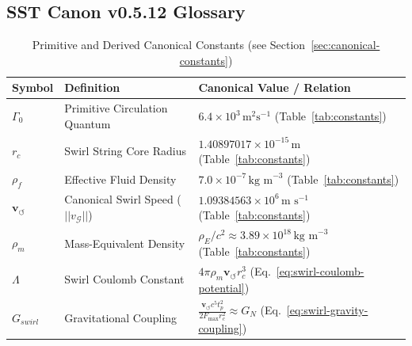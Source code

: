 \documentclass[10pt,reprint,aps,onecolumn,nofootinbib]{revtex4-2}
\begin{document}
            \subsection*{SST Canon v0.5.12 Glossary}
                \begin{table}[h!]
                    \centering
                    \scriptsize
                    \caption{Primitive and Derived Canonical Constants (see Section~\ref{sec:canonical-constants})}
                    \label{tab:glossary-constants}

                    \begin{tabular}{|l|l|l|}
                        \hline
                        \textbf{Symbol} & \textbf{Definition} & \textbf{Canonical Value / Relation} \\
                        \hline
                        $\Gamma_{0}$ & Primitive Circulation Quantum & $6.4 \times 10^{3} \, \text{m}^{2}\text{s}^{-1}$ (Table~\ref{tab:constants}) \\
                        \hline
                        $r_{c}$ & Swirl String Core Radius & $1.40897017 \times 10^{-15} \, \text{m}$ (Table~\ref{tab:constants}) \\
                        \hline
                        $\rho_{\!f}$ & Effective Fluid Density & $7.0 \times 10^{-7} \, \text{kg m}^{-3}$ (Table~\ref{tab:constants}) \\
                        \hline
                        $\mathbf{v}_{\!\boldsymbol{\circlearrowleft}}$ & Canonical Swirl Speed ($||v_{\mathcal{G}}||$) & $1.09384563 \times 10^{6} \, \text{m s}^{-1}$ (Table~\ref{tab:constants}) \\
                        \hline
                        $\rho_{\!m}$ & Mass-Equivalent Density & $\rho_{\!E}/c^2 \approx 3.89 \times 10^{18} \, \text{kg m}^{-3}$ (Table~\ref{tab:constants}) \\
                        \hline
                        $\Lambda$ & Swirl Coulomb Constant & $4\pi \rho_{\!m} \mathbf{v}_{\!\boldsymbol{\circlearrowleft}} r_{c}^{3}$ (Eq.~\ref{eq:swirl-coulomb-potential}) \\
                        \hline
                        $G_{swirl}$ & Gravitational Coupling & $\frac{\mathbf{v}_{\!\boldsymbol{\circlearrowleft}} c^{5} t_{p}^{2}}{2 F_{\text{max}} r_{c}^{2}} \approx G_{N}$ (Eq.~\ref{eq:swirl-gravity-coupling}) \\
                        \hline
                    \end{tabular}
                \end{table}
\end{document}
